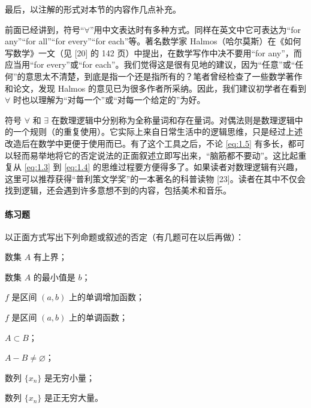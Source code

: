 最后，以注解的形式对本节的内容作几点补充。

\begin{xremark}[1]
前面已经讲到，符号“$\forall$”用中文表达时有多种方式。同样在英文中它可表达为“for any”“for all”“for every”“for each”等。著名数学家 Halmos（哈尔莫斯）在《如何写数学》一文（见 [20] 的 142 页）中提出，在数学写作中决不要用“for any”，而应当用“for every”或“for each”。我们觉得这是很有见地的建议，因为“任意”或“任何”的意思太不清楚，到底是指一个还是指所有的？笔者曾经检查了一些数学著作和论文，发现 Halmos 的意见已为很多作者所采纳。因此，我们建议初学者在看到 $\forall$ 时也以理解为“对每一个”或“对每一个给定的”为好。
\end{xremark}

\begin{xremark}[2]
符号 $\forall$ 和 $\exists$ 在数理逻辑中分别称为全称量词和存在量词。对偶法则是数理逻辑中的一个规则（的重复使用）。它实际上来自日常生活中的逻辑思维，只是经过上述改造后在数学中更便于使用而已。有了这个工具之后，不论 \eqref{eq:1.5} 有多长，都可以轻而易举地将它的否定说法的正面叙述立即写出来，“脑筋都不要动”。这比起重复从 \eqref{eq:1.3} 到 \eqref{eq:1.4} 的思维过程要方便得多了。如果读者对数理逻辑有兴趣，这里可以推荐获得“普利策文学奖”的一本著名的科普读物 [23]。读者在其中不仅会找到逻辑，还会遇到许多意想不到的内容，包括美术和音乐。
\end{xremark}

\paragraph{练习题}
以正面方式写出下列命题或叙述的否定（有几题可在以后再做）：
\begin{xexercise}[1]
数集 $A$ 有上界；
\end{xexercise}

\begin{xexercise}[2]
数集 $A$ 的最小值是 $b$；
\end{xexercise}

\begin{xexercise}[3]
$f$ 是区间 $(a,b)$ 上的单调增加函数；
\end{xexercise}

\begin{xexercise}[4]
$f$ 是区间 $(a,b)$ 上的单调函数；
\end{xexercise}

\begin{xexercise}[5]
$A\subset B$；
\end{xexercise}

\begin{xexercise}[6]
$A-B\ne\varnothing$；
\end{xexercise}

\begin{xexercise}[7]
数列 $\{x_n\}$ 是无穷小量；
\end{xexercise}

\begin{xexercise}[8]
数列 $\{x_n\}$ 是正无穷大量。
\end{xexercise}
